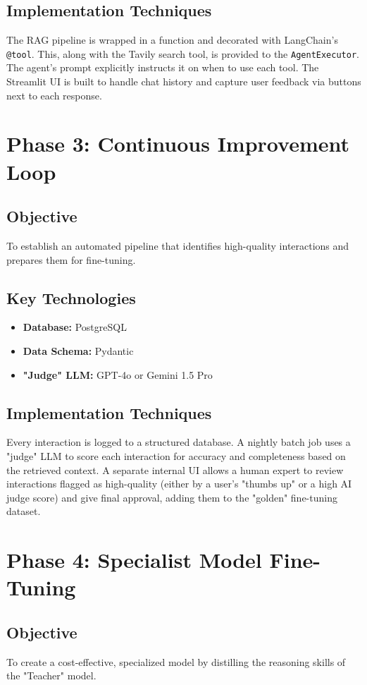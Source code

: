 \documentclass[11pt, a4paper]{article}
\begin{document}
\subsection{Implementation Techniques}
The RAG pipeline is wrapped in a function and decorated with LangChain's \texttt{@tool}. This, along with the Tavily search tool, is provided to the \texttt{AgentExecutor}. The agent's prompt explicitly instructs it on when to use each tool. The Streamlit UI is built to handle chat history and capture user feedback via buttons next to each response.

\section{Phase 3: Continuous Improvement Loop}
\subsection{Objective}
To establish an automated pipeline that identifies high-quality interactions and prepares them for fine-tuning.

\subsection{Key Technologies}
\begin{itemize}
    \item \textbf{Database:} PostgreSQL
    \item \textbf{Data Schema:} Pydantic
    \item \textbf{"Judge" LLM:} GPT-4o or Gemini 1.5 Pro
\end{itemize}

\subsection{Implementation Techniques}
Every interaction is logged to a structured database. A nightly batch job uses a "judge" LLM to score each interaction for accuracy and completeness based on the retrieved context. A separate internal UI allows a human expert to review interactions flagged as high-quality (either by a user's "thumbs up" or a high AI judge score) and give final approval, adding them to the "golden" fine-tuning dataset.

\section{Phase 4: Specialist Model Fine-Tuning}
\subsection{Objective}
To create a cost-effective, specialized model by distilling the reasoning skills of the "Teacher" model.
\end{document}
